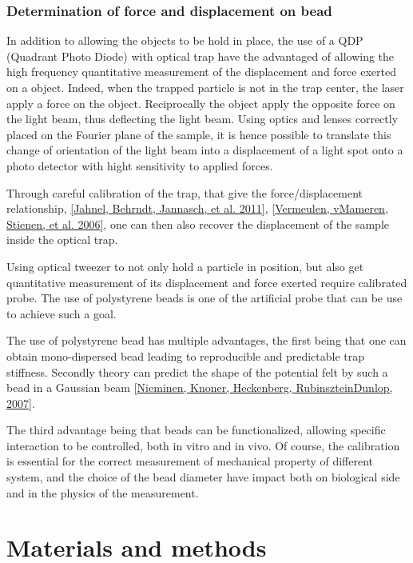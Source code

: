 \documentclass[A4paperpaper,11pt,english]{sphinxmanual}
\begin{document}
\subsection{Determination of force and displacement on bead}
\label{parts/part1:determination-of-force-and-displacement-on-bead}
In addition to allowing the objects to be hold in place, the use of a QDP
(Quadrant Photo Diode) with  optical trap have the advantaged of allowing the
high frequency quantitative measurement of the displacement and force exerted
on a object.
Indeed, when the trapped particle is not in the trap center,
the laser apply a force on the object.
Reciprocally the object apply the opposite force on the light beam,
thus deflecting the light beam.
Using optics and lenses correctly placed on the Fourier plane of the sample, it is
hence possible to translate this change of orientation of the light  beam into
a displacement of a light spot onto a photo detector with hight sensitivity to
applied forces.

Through careful calibration of the trap, that give the force/displacement
relationship, {\hyperref[parts/part1:jahnel2011]{{[}Jahnel, Behrndt, Jannasch,  et al.  2011{]}}}, {\hyperref[parts/part1:vermeulen2006]{{[}Vermeulen, vMameren, Stienen,  et al.  2006{]}}}, one can then also
recover the displacement of the sample inside the optical trap.

Using optical tweezer to not only hold a particle in position, but also get
quantitative measurement of its displacement and force exerted require
calibrated probe. The use of polystyrene beads is one of the artificial probe
that can be use to achieve such a goal.

The use of polystyrene bead has multiple advantages, the first being that one
can obtain mono-dispersed bead leading to reproducible and predictable trap
stiffness. Secondly theory  can predict the shape of
the potential felt by such a bead in a Gaussian beam {\hyperref[parts/part1:nieminen2007]{{[}Nieminen, Knoner, Heckenberg, RubinszteinDunlop,  2007{]}}}.

The third advantage being that beads can be functionalized, allowing specific
interaction to be controlled, both in vitro and in vivo. Of course, the
calibration is essential for the correct measurement of mechanical property of
different system, and the choice of the bead diameter have impact both on
biological side and in the physics of the measurement.


\chapter{Materials and methods}
\label{parts/part2::doc}\label{parts/part2:m-et-m}\label{parts/part2:materials-and-methods}
\end{document}
